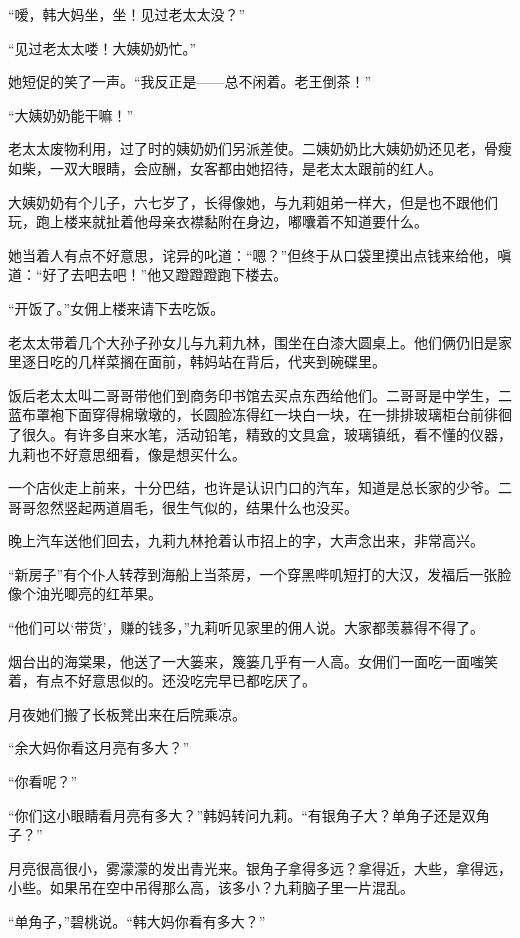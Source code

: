 \par “嗳，韩大妈坐，坐！见过老太太没？”
\par “见过老太太喽！大姨奶奶忙。”
\par 她短促的笑了一声。“我反正是——总不闲着。老王倒茶！”
\par “大姨奶奶能干嘛！”
\par 老太太废物利用，过了时的姨奶奶们另派差使。二姨奶奶比大姨奶奶还见老，骨瘦如柴，一双大眼睛，会应酬，女客都由她招待，是老太太跟前的红人。
\par 大姨奶奶有个儿子，六七岁了，长得像她，与九莉姐弟一样大，但是也不跟他们玩，跑上楼来就扯着他母亲衣襟黏附在身边，嘟囔着不知道要什么。
\par 她当着人有点不好意思，诧异的叱道：“嗯？”但终于从口袋里摸出点钱来给他，嗔道：“好了去吧去吧！”他又蹬蹬蹬跑下楼去。
\par “开饭了。”女佣上楼来请下去吃饭。
\par 老太太带着几个大孙子孙女儿与九莉九林，围坐在白漆大圆桌上。他们俩仍旧是家里逐日吃的几样菜搁在面前，韩妈站在背后，代夹到碗碟里。
\par 饭后老太太叫二哥哥带他们到商务印书馆去买点东西给他们。二哥哥是中学生，二蓝布罩袍下面穿得棉墩墩的，长圆脸冻得红一块白一块，在一排排玻璃柜台前徘徊了很久。有许多自来水笔，活动铅笔，精致的文具盒，玻璃镇纸，看不懂的仪器，九莉也不好意思细看，像是想买什么。
\par 一个店伙走上前来，十分巴结，也许是认识门口的汽车，知道是总长家的少爷。二哥哥忽然竖起两道眉毛，很生气似的，结果什么也没买。
\par 晚上汽车送他们回去，九莉九林抢着认市招上的字，大声念出来，非常高兴。
\par “新房子”有个仆人转荐到海船上当茶房，一个穿黑哔叽短打的大汉，发福后一张脸像个油光唧亮的红苹果。
\par “他们可以‘带货’，赚的钱多，”九莉听见家里的佣人说。大家都羡慕得不得了。
\par 烟台出的海棠果，他送了一大篓来，篾篓几乎有一人高。女佣们一面吃一面嗤笑着，有点不好意思似的。还没吃完早已都吃厌了。
\par 月夜她们搬了长板凳出来在后院乘凉。
\par “余大妈你看这月亮有多大？”
\par “你看呢？”
\par “你们这小眼睛看月亮有多大？”韩妈转问九莉。“有银角子大？单角子还是双角子？”
\par 月亮很高很小，雾濛濛的发出青光来。银角子拿得多远？拿得近，大些，拿得远，小些。如果吊在空中吊得那么高，该多小？九莉脑子里一片混乱。
\par “单角子，”碧桃说。“韩大妈你看有多大？”

